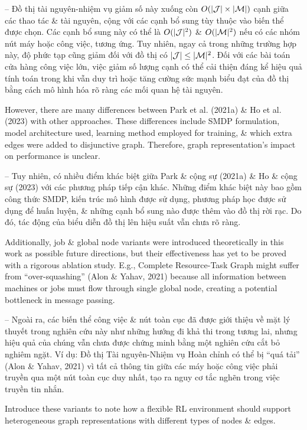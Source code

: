 \documentclass{article}
\begin{document}
\begin{itemize}
\begin{itemize}
\begin{itemize}
            -- Đồ thị tài nguyên-nhiệm vụ giảm số này xuống còn $O(|{\cal J}|\times|{\cal M}|)$ cạnh giữa các thao tác \& tài nguyên, cộng với các cạnh bổ sung tùy thuộc vào biến thể được chọn. Các cạnh bổ sung này có thể là $O(|{\cal J}|^2)$ \& $O(|{\cal M}|^2)$ nếu có các nhóm nút máy hoặc công việc, tương ứng. Tuy nhiên, ngay cả trong những trường hợp này, độ phức tạp cũng giảm đối với đồ thị có $|{\cal J}|\le|{\cal M}|^2$. Đối với các bài toán cửa hàng công việc lớn, việc giảm số lượng cạnh có thể cải thiện đáng kể hiệu quả tính toán trong khi vẫn duy trì hoặc tăng cường sức mạnh biểu đạt của đồ thị bằng cách mô hình hóa rõ ràng các mối quan hệ tài nguyên.

            However, there are many differences between Park et al. (2021a) \& Ho et al. (2023) with other approaches. These differences include SMDP formulation, model architecture used, learning method employed for training, \& which extra edges were added to disjunctive graph. Therefore, graph representation's impact on performance is unclear.

            -- Tuy nhiên, có nhiều điểm khác biệt giữa Park \& cộng sự (2021a) \& Ho \& cộng sự (2023) với các phương pháp tiếp cận khác. Những điểm khác biệt này bao gồm công thức SMDP, kiến trúc mô hình được sử dụng, phương pháp học được sử dụng để huấn luyện, \& những cạnh bổ sung nào được thêm vào đồ thị rời rạc. Do đó, tác động của biểu diễn đồ thị lên hiệu suất vẫn chưa rõ ràng.

            Additionally, job \& global node variants were introduced theoretically in this work as possible future directions, but their effectiveness has yet to be proved with a rigorous ablation study. E.g., Complete Resource-Task Graph might suffer from ``over-squashing'' (Alon \& Yahav, 2021) because all information between machines or jobs must flow through single global node, creating a potential bottleneck in message passing.

            -- Ngoài ra, các biến thể công việc \& nút toàn cục đã được giới thiệu về mặt lý thuyết trong nghiên cứu này như những hướng đi khả thi trong tương lai, nhưng hiệu quả của chúng vẫn chưa được chứng minh bằng một nghiên cứu cắt bỏ nghiêm ngặt. Ví dụ: Đồ thị Tài nguyên-Nhiệm vụ Hoàn chỉnh có thể bị ``quá tải'' (Alon \& Yahav, 2021) vì tất cả thông tin giữa các máy hoặc công việc phải truyền qua một nút toàn cục duy nhất, tạo ra nguy cơ tắc nghẽn trong việc truyền tin nhắn.

            Introduce these variants to note how a flexible RL environment should support heterogeneous graph representations with different types of nodes \& edges.


\end{itemize}
\end{itemize}
\end{itemize}
\end{document}
